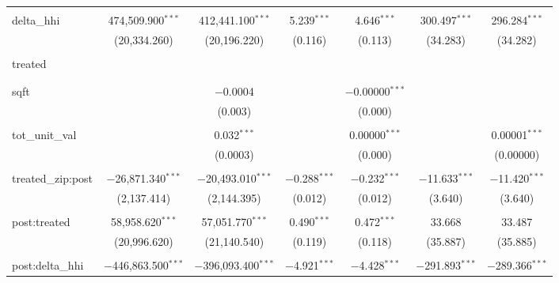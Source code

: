 \begin{table}[H]
{\begin{tabular}{@{\extracolsep{5pt}}lcccccc}
   & & & & & & \\  

  delta\_hhi & 474,509.900$^{***}$ & 412,441.100$^{***}$ & 5.239$^{***}$ & 4.646$^{***}$ & 300.497$^{***}$ & 296.284$^{***}$ \\  

   & (20,334.260) & (20,196.220) & (0.116) & (0.113) & (34.283) & (34.282) \\  

   & & & & & & \\  

  treated &  &  &  &  &  &  \\  

   &  &  &  &  &  &  \\  

   & & & & & & \\  

  sqft &  & $-$0.0004 &  & $-$0.00000$^{***}$ &  &  \\  

   &  & (0.003) &  & (0.000) &  &  \\  

   & & & & & & \\  

  tot\_unit\_val &  & 0.032$^{***}$ &  & 0.00000$^{***}$ &  & 0.00001$^{***}$ \\  

   &  & (0.0003) &  & (0.000) &  & (0.00000) \\  

   & & & & & & \\  

  treated\_zip:post & $-$26,871.340$^{***}$ & $-$20,493.010$^{***}$ & $-$0.288$^{***}$ & $-$0.232$^{***}$ & $-$11.633$^{***}$ & $-$11.420$^{***}$ \\  

   & (2,137.414) & (2,144.395) & (0.012) & (0.012) & (3.640) & (3.640) \\  

   & & & & & & \\  

  post:treated & 58,958.620$^{***}$ & 57,051.770$^{***}$ & 0.490$^{***}$ & 0.472$^{***}$ & 33.668 & 33.487 \\  

   & (20,996.620) & (21,140.540) & (0.119) & (0.118) & (35.887) & (35.885) \\  

   & & & & & & \\  

  post:delta\_hhi & $-$446,863.500$^{***}$ & $-$396,093.400$^{***}$ & $-$4.921$^{***}$ & $-$4.428$^{***}$ & $-$291.893$^{***}$ & $-$289.366$^{***}$ \\  


\end{tabular}}
\end{table}

